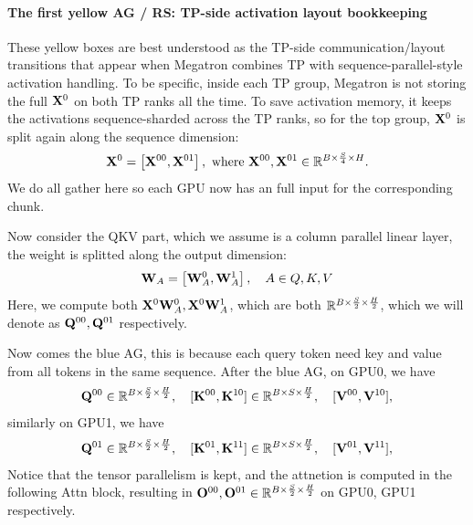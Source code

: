 \documentclass[11pt]{article}  %
\begin{document}
\paragraph{The first yellow AG / RS: TP-side activation layout bookkeeping}
These yellow boxes are best understood as the TP-side communication/layout transitions that appear when Megatron combines TP with sequence-parallel-style activation handling.
To be specific, inside each TP group, Megatron is not storing the full $\mathbf{X}^0$ on both TP ranks all the time.
To save activation memory, it keeps the activations sequence-sharded across the TP ranks, so for the top group, $\mathbf{X}^0$ is split again along the sequence dimension:
\begin{align*}
  \mathbf{X}^0 = \left[ \mathbf{X}^{00}, \mathbf{X}^{01} \right], \text{   where  } \mathbf{X}^{00}, \mathbf{X}^{01} \in \mathbb{R}^{B \times \frac{S}{4} \times H}.
\end{align*}
We do all gather here so each GPU now has an full input for the corresponding chunk.

Now consider the QKV part, which we assume is a column parallel linear layer, the weight is splitted along the output dimension:
\begin{align*}
  \mathbf{W}_A = \left[ \mathbf{W}_A^0, \mathbf{W}_A^1 \right], \quad A \in {Q, K, V}
\end{align*}
Here, we compute both $\mathbf{X}^0\mathbf{W}_A^0, \mathbf{X}^0\mathbf{W}_A^1$, which are both $\mathbb{R}^{B \times \frac{S}{2} \times \frac{H}{2}}$, which we will denote as $\mathbf{Q}^{00}, \mathbf{Q}^{01}$ respectively.

Now comes the blue AG, this is because each query token need key and value from all tokens in the same sequence.
After the blue AG, on GPU0, we have 
\begin{align*}
  \mathbf{Q}^{00} \in \mathbb{R}^{B \times \frac{S}{2} \times \frac{H}{2}}, \quad [\mathbf{K}^{00}, \mathbf{K}^{10}] \in \mathbb{R}^{B \times S \times \frac{H}{2}}, \quad [\mathbf{V}^{00}, \mathbf{V}^{10}],
\end{align*}
similarly on GPU1, we have 
\begin{align*}
  \mathbf{Q}^{01} \in \mathbb{R}^{B \times \frac{S}{2} \times \frac{H}{2}}, \quad [\mathbf{K}^{01}, \mathbf{K}^{11}] \in \mathbb{R}^{B \times S \times \frac{H}{2}}, \quad [\mathbf{V}^{01}, \mathbf{V}^{11}],
\end{align*}
Notice that the tensor parallelism is kept, and the attnetion is computed in the following Attn block, resulting in $\mathbf{O}^{00}, \mathbf{O}^{01} \in \mathbb{R}^{B \times \frac{S}{2} \times \frac{H}{2}}$ on GPU0, GPU1 respectively.
\end{document}
